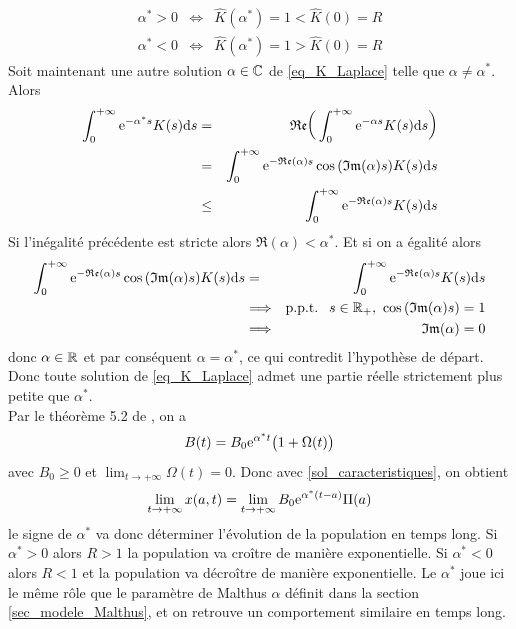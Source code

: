 \begin{eqnarray*}
    \alpha^* >0 &\iff& \hat{K}(\alpha^*) = 1 < \hat{K}(0) = R \\
    \alpha^* < 0 &\iff& \hat{K}(\alpha^*) = 1 > \hat{K}(0)=R
\end{eqnarray*}
Soit maintenant une autre solution $\alpha \in \mathbb{C}$ de \eqref{eq_K_Laplace} telle que $\alpha \neq \alpha^*$. Alors 
\begin{eqnarray*}
    \int_0^{+\infty} \mathrm{e}^{-\alpha^*s}K(s)\mathrm{d} s &=& \mathfrak{Re}\bigg(\int_0^{+\infty} \mathrm{e}^{-\alpha s}K(s)\mathrm{d} s\bigg) \\
    &=& \int_0^{+\infty} \mathrm{e}^{-\mathfrak{Re}(\alpha) s}\cos{(\mathfrak{Im}(\alpha)s)}K(s)\mathrm{d} s \\
    &\leq& \int_0^{+\infty} \mathrm{e}^{-\mathfrak{Re}(\alpha) s}K(s) \mathrm{d} s
\end{eqnarray*}
Si l'inégalité précédente est stricte alors $\Re(\alpha) < \alpha^*$. Et si on a égalité alors 
\begin{eqnarray*}
    \int_0^{+\infty} \ex^{-\Re(\alpha) s}\cos{(\Im(\alpha)s)}K(s)\d s &=& \int_0^{+\infty} \ex^{-\Re(\alpha) s}K(s) \d s \\
    &\Longrightarrow& \text{p.p.t. } \ s \in \bbR_+, \ \cos{(\Im(\alpha)s)}=1 \\
    &\Longrightarrow& \Im(\alpha) = 0
\end{eqnarray*}
donc $\alpha \in \mathbb{R}$ et par conséquent $\alpha = \alpha^*$, ce qui contredit l'hypothèse de départ. Donc toute solution de \eqref{eq_K_Laplace} admet une partie réelle strictement plus petite que $\alpha^*$.
\\
Par le théorème 5.2 de \cite{Iannelli1995}, on a 
\begin{equation*}
    B(t) = B_0\mathrm{e}^{\alpha^*t}\big(1+\Omega(t)\big)
\end{equation*}
avec $B_0 \geq 0$ et $\displaystyle{\lim_{t \to +\infty}} \Omega(t)=0$. Donc avec \eqref{sol_caracteristiques}, on obtient 
\begin{equation*}
    \lim_{t \to +\infty} x(a,t) = \lim_{t \to +\infty} B_0\mathrm{e}^{\alpha^*(t-a)}\Pi(a)
\end{equation*}
le signe de $\alpha^*$ va donc déterminer l'évolution de la population en temps long. Si $\alpha^*>0$ alors $R>1$ la population va croître de manière exponentielle. Si $\alpha^*<0$ alors $R<1$ et la population va décroître de manière exponentielle. Le $\alpha^*$ joue ici le même rôle que le paramètre de Malthus $\alpha$ définit dans la section \ref{sec_modele_Malthus}, et on retrouve un comportement similaire en temps long.
